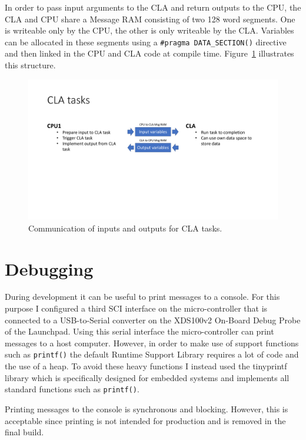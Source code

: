 In order to pass input arguments to the CLA and return outputs to the CPU, the CLA and CPU share a Message RAM consisting of two 128 word segments. One is writeable only by the CPU, the other is only writeable by the CLA. Variables can be allocated in these segments using a \texttt{#pragma DATA_SECTION()} directive and then linked in the CPU and CLA code at compile time. Figure~\ref{fig:CLA_communication} illustrates this structure.

\begin{figure}[H]
    \centering \includegraphics[width=1.0\textwidth]{./figures/CLA_communication.pdf}
    \caption{Communication of inputs and outputs for CLA tasks.}
    \label{fig:CLA_communication}
\end{figure}

\section{Debugging}

During development it can be useful to print messages to a console. For this purpose I configured a third SCI interface on the micro-controller that is connected to a USB-to-Serial converter on the XDS100v2 On-Board Debug Probe of the Launchpad. Using this serial interface the micro-controller can print messages to a host computer. However, in order to make use of support functions such as \texttt{printf()} the default Runtime Support Library requires a lot of code and the use of a heap. To avoid these heavy functions I instead used the tinyprintf library\cite{tinyprintf} which is specifically designed for embedded systems and implements all standard functions such as \texttt{printf()}.

Printing messages to the console is synchronous and blocking. However, this is acceptable since  printing is not intended for production and is removed in the final build.

